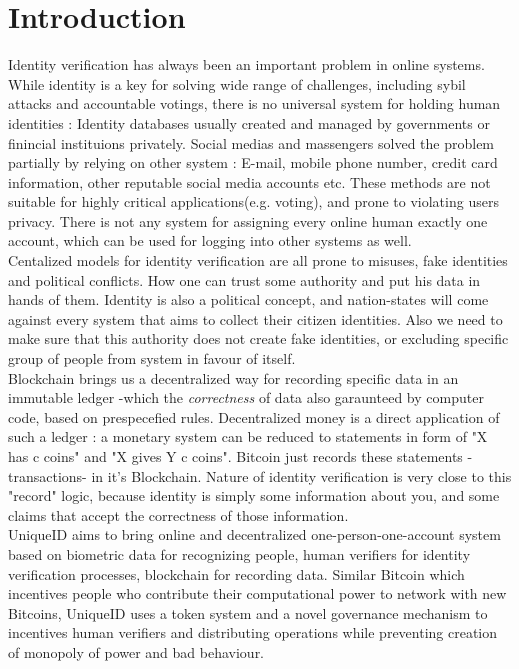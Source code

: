 \documentclass{article}
\begin{document}
\section{Introduction}
Identity verification  has  always been an important problem in online systems. While identity is a key for solving wide range of challenges, including sybil attacks and accountable votings, there is no universal system  for holding human identities : Identity databases usually created and managed by governments or finincial instituions privately. Social medias and massengers solved the problem partially by relying on other system : E-mail, mobile phone number, credit card information, other reputable social media accounts etc. These methods are not suitable for highly critical applications(e.g. voting), and prone to violating users privacy. There is not any system for assigning every online human exactly one account, which can be used for logging into other systems as well.
\\
Centalized models for identity verification are all prone to misuses, fake identities and political conflicts. How one can trust some  authority and put his data in hands of them.  Identity is also a political concept, and nation-states will come against every system that aims to collect their citizen identities. Also we need to make sure that this authority does not create fake identities, or excluding specific group of people from system in favour of itself.
\\
Blockchain brings us a decentralized way for recording specific data in an immutable ledger -which the \textit{correctness} of data also garaunteed by computer code, based on prespecefied rules. Decentralized money is a direct application of such a ledger : a monetary system can be reduced to statements in form of "X has c coins" and "X gives Y c coins". Bitcoin just records these statements -transactions- in it's Blockchain. Nature of identity verification is very close to this "record" logic, because identity is simply some information about you, and some claims that accept the correctness of those information. 
\\
UniqueID aims to bring online and decentralized one-person-one-account system based on biometric data for recognizing people, human verifiers for identity verification processes, blockchain for recording data. Similar Bitcoin which incentives people who contribute their computational power to network with new Bitcoins, UniqueID uses a token system and a novel governance mechanism to incentives human verifiers and distributing operations while preventing creation of monopoly of power and bad behaviour.
\end{document}
